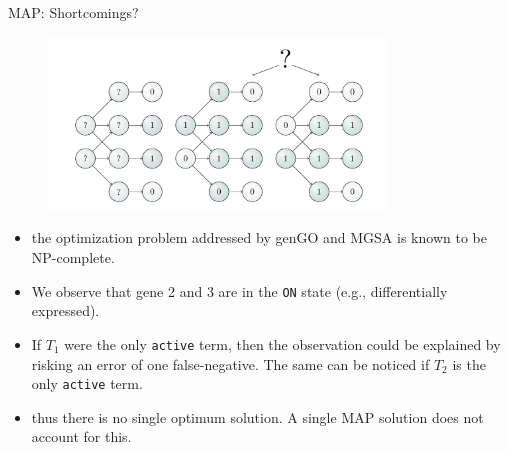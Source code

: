 \documentclass{beamer}
\begin{document}
\begin{frame}{MAP: Shortcomings?}
 
 \begin{figure}
 \centering
 \includegraphics[width=0.8\textwidth]{./img/MGSA-twonetworks.png}
\end{figure}
\begin{tiny}\begin{itemize}
 \item  the optimization problem addressed by
  genGO and MGSA is known to be NP-complete. 
  \item  We observe that
  gene 2 and 3 are in the \texttt{ON} state (e.g., differentially
  expressed).
  \item  If $T_1$ were the only \texttt{active} term, then the observation
  could be explained by risking an error of one false-negative. The
  same can be noticed if $T_2$ is the only \texttt{active} term.
  \item thus there is no
  single optimum solution. A single MAP solution does not account for
  this.
\end{itemize}             
\end{tiny}

\end{frame}



\end{document}
